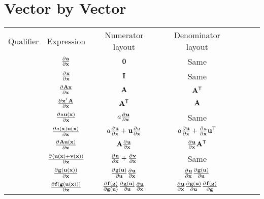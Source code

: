 \section{Vector by Vector}
\begin{center}
\begin{tabular}{l|Sc|Sc|Sc}
Qualifier                  & Expression                                    & Numerator layout                                   & Denominator layout                            \\
                           & $\pd{\va}{\vx}$                               & $\vzero$                                           & Same                                          \\ %
                           & $\pd{\vx}{\vx}$                               & $\mI$                                              & Same                                          \\ %
                           & $\pd{\mA\vx}{\vx}$                            & $\mA$                                              & $\mAT$                                        \\
                           & $\pd{\vxT\mA}{\vx}$                           & $\mAT$                                             & $\mA$                                         \\
                           & $\pd{a\vu(\vx)}{\vx}$                         & $a\pd{\vu}{\vx}$                                   & Same                                          \\
                           & $\pd{a(\vx)\vu(\vx)}{\vx}$                    & $a\pd{\vu}{\vx}+\vu\pd{a}{\vx}$                    & $a\pd{\vu}{\vx}+\pd{a}{\vx}\vuT$              \\
                           & $\pd{\mA\vu(\vx)}{\vx}$                       & $\mA\pd{\vu}{\vx}$                                 & $\pd{\vu}{\vx}\mAT$                           \\
                           & $\pd{(\vu(\vx)+\vv(\vx))}{\vx}$               & $\pd{\vu}{\vx}+\pd{\vv}{\vx}$                      & Same                                          \\
                           & $\pd{\vg(\vu(\vx))}{\vx}$                     & $\pd{\vg(\vu)}{\vu}\pd{\vu}{\vx}$                  & $\pd{\vu}{\vx}\pd{\vg(\vu)}{\vu}$             \\
                           & $\pd{\vf(\vg(\vu(\vx)))}{\vx}$                & $\pd{\vf(\vg)}{\vg(\vu)}\pd{\vg(\vu)}{\vu}\pd{\vu}{\vx}$& $\pd{\vu}{\vx}\pd{\vg(\vu)}{\vu}\pd{\vf(\vg)}{\vg}$
\end{tabular}
\end{center}




